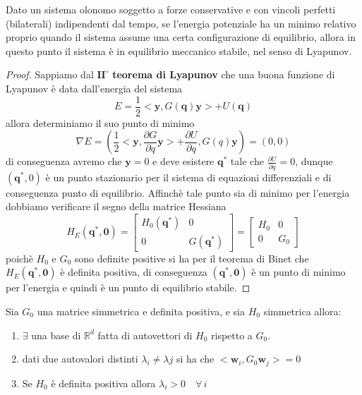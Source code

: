 \begin{theorem}
Dato un sistema olonomo soggetto a forze conservative e con vincoli perfetti (bilaterali) indipendenti dal tempo, se l'energia potenziale ha un minimo relativo proprio quando il sistema assume una certa configurazione di equilibrio, allora in questo punto il sistema è in equilibrio meccanico stabile, nel senso di Lyapunov.
\end{theorem}
\begin{proof}
		Sappiamo dal $\bm{II^{\circ}}$ \textbf{teorema di Lyapunov} che una buona funzione di Lyapunov \`{e} data dall'energia del sistema 
	\begin{equation}
		E = \frac{1}{2}<\bm{{y}},G(\bm{q})\bm{y}> + U(\bm{q})
	\end{equation}
	allora determiniamo il suo punto di minimo
	\begin{equation}
\nabla E=\left(\frac{1}{2} <\bm{y} ,\frac{\partial G}{\partial q} \bm{y}>+\frac{\partial U}{\partial q}, G(q) \bm{y}\right)=(0,0)
\end{equation}
di conseguenza avremo che $\bm{y} = 0 $ e deve esistere $\bm{q}^*$ tale che $\frac{\partial U}{\partial q} = 0$, dunque $(\bm{q}^{*},0)$ \`{e} un punto stazionario per il sistema di equazioni differenziali e di conseguenza punto di equilibrio. Affinch\`{e} tale punto sia di minimo per l'energia dobbiamo verificare il segno della matrice Hessiana 
\begin{equation}
H_E\left(\bm{q}^*, \bm{0}\right)=\left[\begin{array}{c|c}
H_0\left(\bm{q}^*\right) & 0 \\
\hline 0 & G\left(\bm{q}^*\right)
\end{array}\right]=\left[\begin{array}{c|c}
H_0 & 0 \\
\hline 0 & G_0
\end{array}\right]
\end{equation}
poich\`{e} $H_0$ e $G_0$ sono definite positive si ha per il teorema di Binet che $H_E(\bm{q}^*,\bm{0})$ \`{e} definita positiva, di conseguenza $(\bm{q}^*,\bm{0})$ \`{e} un punto di minimo per l'energia e quindi \`{e} un punto di equilibrio stabile.
 
\end{proof}

\begin{theorem}
	Sia $G_0$ una matrice simmetrica e definita positiva, e sia $H_0$ simmetrica allora:
	\begin{enumerate}
		\item $\exists$ una base di $\mathbb{R}^d$ fatta di autovettori di $H_0$ rispetto a $G_0$.
		\item dati due autovalori distinti $\lambda_i \neq \lambda j$ si ha che $<\bm{w}_i,G_0\bm{w}_j> = 0$
		\item Se $H_0$ \`{e} definita positiva allora $\lambda_i > 0 \quad \forall\,i$ 
	\end{enumerate}
\end{theorem}

